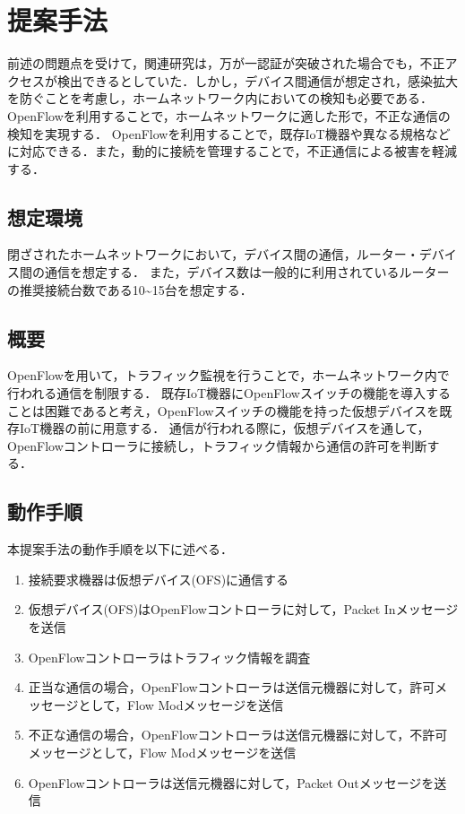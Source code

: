 \documentclass[a4paper,10pt,twocolumn,uplatex]{jsarticle}
\begin{document}
\section{提案手法}
前述の問題点を受けて，関連研究は，万が一認証が突破された場合でも，不正アクセスが検出できるとしていた．しかし，デバイス間通信が想定され，感染拡大を防ぐことを考慮し，ホームネットワーク内においての検知も必要である．
OpenFlowを利用することで，ホームネットワークに適した形で，不正な通信の検知を実現する．
OpenFlowを利用することで，既存IoT機器や異なる規格などに対応できる．また，動的に接続を管理することで，不正通信による被害を軽減する．

\subsection{想定環境}
閉ざされたホームネットワークにおいて，デバイス間の通信，ルーター・デバイス間の通信を想定する．
また，デバイス数は一般的に利用されているルーターの推奨接続台数である10\textasciitilde15台を想定する．

\subsection{概要}
OpenFlowを用いて，トラフィック監視を行うことで，ホームネットワーク内で行われる通信を制限する．
既存IoT機器にOpenFlowスイッチの機能を導入することは困難であると考え，OpenFlowスイッチの機能を持った仮想デバイスを既存IoT機器の前に用意する．
通信が行われる際に，仮想デバイスを通して，OpenFlowコントローラに接続し，トラフィック情報から通信の許可を判断する．

\subsection{動作手順}
本提案手法の動作手順を以下に述べる．

\begin{enumerate}
  \item 接続要求機器は仮想デバイス(OFS)に通信する
  \item 仮想デバイス(OFS)はOpenFlowコントローラに対して，Packet Inメッセージを送信
  \item OpenFlowコントローラはトラフィック情報を調査
  \item 正当な通信の場合，OpenFlowコントローラは送信元機器に対して，許可メッセージとして，Flow Modメッセージを送信
  \item 不正な通信の場合，OpenFlowコントローラは送信元機器に対して，不許可メッセージとして，Flow Modメッセージを送信
  \item OpenFlowコントローラは送信元機器に対して，Packet Outメッセージを送信
\end{enumerate}
\end{document}
